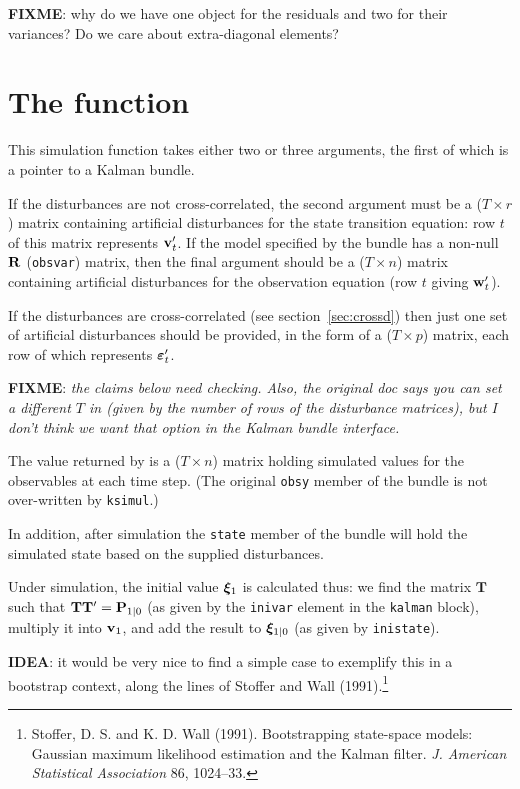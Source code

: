 \documentclass[a4paper]{article}
\begin{document}
\textbf{FIXME}: why do we have one object for the residuals and  two
for their variances? Do we care about extra-diagonal elements?

\section{The  function}
\label{sec:ksimul}

This simulation function takes either two or three arguments, the
first of which is a pointer to a Kalman bundle.

If the disturbances are not cross-correlated, the second argument must
be a ($T \times r$) matrix containing artificial disturbances for the
state transition equation: row $t$ of this matrix represents
$\mathbf{v}_t'$. If the model specified by the bundle has a non-null
$\mathbf{R}$ (\texttt{obsvar}) matrix, then the final argument should be
a ($T \times n$) matrix containing artificial disturbances for the
observation equation (row $t$ giving $\mathbf{w}_t'$).

If the disturbances are cross-correlated (see
section~\ref{sec:crossd}) then just one set of artificial disturbances
should be provided, in the form of a ($T \times p$) matrix, each row
of which represents $\bm{\varepsilon}_t'$.

\textbf{FIXME}: \emph{the claims below need checking. Also, the original doc says you
can set a different $T$ in  (given by the number of
rows of the disturbance matrices), but I don't think we want that
option in the Kalman bundle interface.}

The value returned by  is a ($T \times n$) matrix
holding simulated values for the observables at each time step.  (The
original \texttt{obsy} member of the bundle is not over-written by
\texttt{ksimul}.)

In addition, after simulation the \texttt{state} member of the bundle
will hold the simulated state based on the supplied disturbances.

Under simulation, the initial value $\bm{\xi}_1$ is calculated thus:
we find the matrix $\mathbf{T}$ such that
$\mathbf{T}\mathbf{T}' = \mathbf{P}_{1|0}$ (as given by the
\texttt{inivar} element in the \texttt{kalman} block), multiply it
into $\mathbf{v}_1$, and add the result to $\bm{\xi}_{1|0}$ (as given
by \texttt{inistate}).

\textbf{IDEA}: it would be very nice to find a simple case to
exemplify this in a bootstrap context, along the lines of Stoffer and
Wall (1991).\footnote{Stoffer, D. S. and K. D. Wall
  (1991). Bootstrapping state-space models: Gaussian maximum
  likelihood estimation and the Kalman filter. \emph{J. American
    Statistical Association} 86, 1024--33.}
\end{document}
